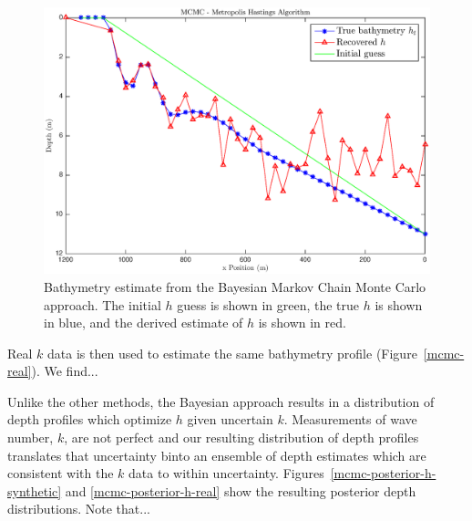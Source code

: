 \begin{figure}[H]
\center
\includegraphics[scale=0.46]{img/MCMC-manufactured.eps} %
\caption{Bathymetry estimate from the Bayesian Markov Chain Monte Carlo approach. The initial $h$ guess is shown in green, the true $h$ is shown in blue, and the derived estimate of $h$ is shown in red.}
\label{mcmc-synthetic}
\end{figure}

Real $k$ data is then used to estimate the same bathymetry profile (Figure~\ref{mcmc-real}). We find...


Unlike the other methods, the Bayesian approach results in a distribution of depth profiles which optimize $h$ given uncertain $k$. Measurements of wave number, $k$, are not perfect and our resulting distribution of depth profiles translates that uncertainty binto an ensemble of depth estimates which are consistent with the $k$ data to within uncertainty. Figures~\ref{mcmc-posterior-h-synthetic} and \ref{mcmc-posterior-h-real} show the resulting posterior depth distributions. Note that...




